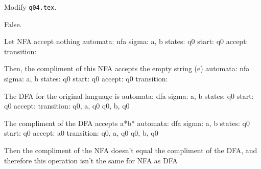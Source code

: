 Modify \verb!q04.tex!.

\begin{console}
False.

Let NFA accept nothing
automata: nfa
sigma: a, b
states: q0
start: q0
accept:
transition:

Then, the compliment of this NFA accepts the empty string (e)
automata: nfa
sigma: a, b
states: q0
start: q0
accept: q0
transition:

The DFA for the original language is
automata: dfa
sigma: a, b
states: q0
start: q0
accept:
transition:
q0, a, q0
q0, b, q0

The compliment of the DFA accepts a*b*
automata: dfa
sigma: a, b
states: q0
start: q0
accept: a0
transition:
q0, a, q0
q0, b, q0

Then the compliment of the NFA doesn't equal the compliment of the DFA,
and therefore this operation isn't the same for NFA as DFA
\end{console}